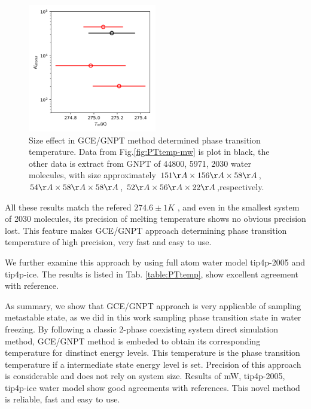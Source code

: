 \documentclass[aps,prl,twocolumn,superscriptaddress]{revtex4-1}
\begin{document}
\begin{figure}[ht]
\centering{}\includegraphics[width=0.5\textwidth]{size_effect.png} 
\caption{Size effect in GCE/GNPT method determined phase transition temperature. Data from Fig.\ref{fig:PTtemp-mw} is plot in black, the other data is extract from GNPT of 44800, 5971, 2030 water molecules, with size approximately $151\AA \times  156 \AA \times  58 \AA$, $54 \AA \times  58 \AA \times  58 \AA$, $52\AA \times  56 \AA \times  22\AA$,respectively.
\label{fig:sizeeffect}} 
\end{figure}
All these results match the refered $274.6\pm 1K$ , and even in the smallest system of 2030 molecules, its precision of melting temperature shows no obvious precision lost. This feature makes GCE/GNPT approach determining phase transition temperature of high precision, very fast and easy to use.

We further examine this approach by using full atom water model tip4p-2005 and tip4p-ice. The results is listed in Tab. \ref{table:PTtemp}, show excellent agreement with reference\cite{Abascal2005}.
 
 
 

As summary, we show that GCE/GNPT approach is very applicable of sampling metastable state, as we did in this work sampling phase transition state in water freezing. By following a classic 2-phase coexisting system direct simulation method, GCE/GNPT method is embeded to obtain its corresponding temperature for dinstinct energy levels. This temperature is the phase transition temperature if a intermediate state energy level is set. Precision of this approach is considerable and does not rely on system size. Results of mW, tip4p-2005, tip4p-ice water model show good agreements with references. This novel method is reliable, fast and easy to use.
    
\end{document}

